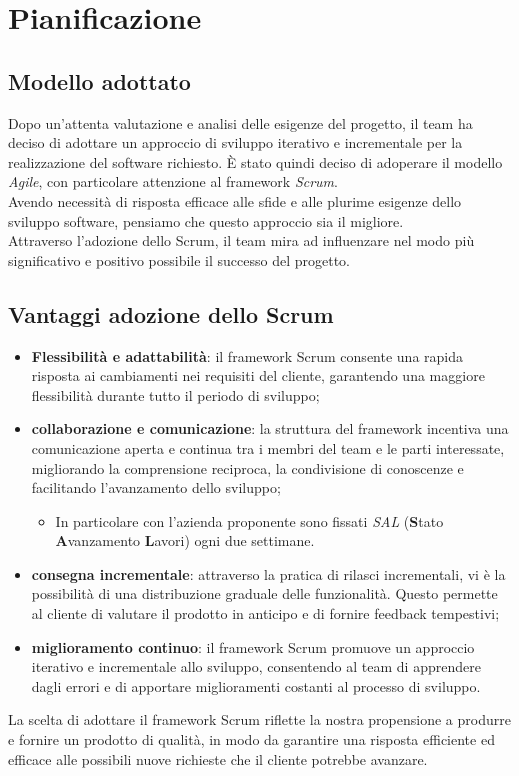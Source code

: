 
\section{Pianificazione}
\subsection{Modello adottato}
Dopo un'attenta valutazione e analisi delle esigenze del progetto, il team ha deciso di adottare un approccio di sviluppo iterativo e incrementale per la realizzazione del software richiesto. È stato quindi deciso di adoperare il modello \textit{Agile}, con particolare attenzione al framework \textit{Scrum}.\\
Avendo necessità di risposta efficace alle sfide e alle plurime esigenze dello sviluppo software, pensiamo che questo approccio sia il migliore.\\
Attraverso l'adozione dello Scrum, il team mira ad influenzare nel modo più significativo e positivo possibile il successo del progetto.
\subsection{Vantaggi adozione dello Scrum}
\begin{itemize}
    \item \textbf{Flessibilità e adattabilità}: il framework Scrum consente una rapida risposta ai cambiamenti nei requisiti del cliente, garantendo una maggiore flessibilità durante tutto il periodo di sviluppo;
    \item \textbf{collaborazione e comunicazione}: la struttura del framework incentiva una comunicazione aperta e continua tra i membri del team e le parti interessate, migliorando la comprensione reciproca, la condivisione di conoscenze e facilitando l'avanzamento dello sviluppo;
    \begin{itemize}
        \item In particolare con l’azienda proponente sono fissati \textit{SAL} (\textbf{S}tato \textbf{A}vanzamento \textbf{L}avori) ogni due settimane.       
    \end{itemize}
    \item \textbf{consegna incrementale}: attraverso la pratica di rilasci incrementali, vi è la possibilità di una distribuzione graduale delle funzionalità. Questo permette al cliente di valutare il prodotto in anticipo e di fornire feedback tempestivi;
    \item \textbf{miglioramento continuo}: il framework Scrum promuove un approccio iterativo e incrementale allo sviluppo, consentendo al team di apprendere dagli errori e di apportare miglioramenti costanti al processo di sviluppo.
\end{itemize}
La scelta di adottare il framework Scrum riflette la nostra propensione a produrre e fornire un prodotto di qualità, in modo da garantire una risposta efficiente ed efficace alle possibili nuove richieste che il cliente potrebbe avanzare.

